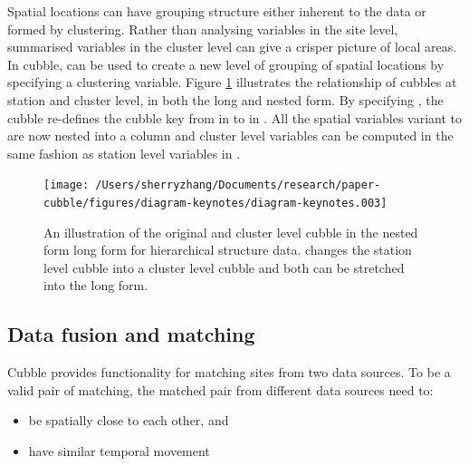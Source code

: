 \documentclass[
]{jss}
\providecommand{\tightlist}{%
  \setlength{\itemsep}{0pt}\setlength{\parskip}{0pt}}
\begin{document}
Spatial locations can have grouping structure either inherent to the
data or formed by clustering. Rather than analysing variables in the
site level, summarised variables in the cluster level can give a crisper
picture of local areas. In cubble,  can be used to
create a new level of grouping of spatial locations by specifying a
clustering variable. Figure \ref{fig:illu-hier} illustrates the
relationship of cubbles at station and cluster level, in both the long
and nested form. By specifying
,
the cubble re-defines the cubble key from  in
 to  in . All
the spatial variables variant to  are now nested into a
 column and cluster level variables can be computed in the
same fashion as station level variables in .

\begin{CodeChunk}
\begin{figure}

{\centering \texttt{[image: /Users/sherryzhang/Documents/research/paper-cubble/figures/diagram-keynotes/diagram-keynotes.003]} 

}

\caption[An illustration of the original and cluster level cubble in the nested form long form for hierarchical structure data]{An illustration of the original and cluster level cubble in the nested form long form for hierarchical structure data.  changes the station level cubble into a cluster level cubble and both can be stretched into the long form.}\label{fig:illu-hier}
\end{figure}
\end{CodeChunk}

\hypertarget{data-fusion-and-matching}{%
\subsection{Data fusion and matching}\label{data-fusion-and-matching}}

Cubble provides functionality for matching sites from two data sources.
To be a valid pair of matching, the matched pair from different data
sources need to:

\begin{itemize}
\tightlist
\item
  be spatially close to each other, and
\item
  have similar temporal movement
\end{itemize}
\end{document}
